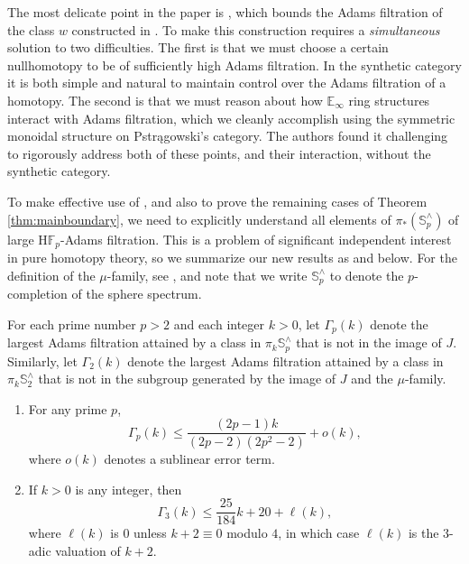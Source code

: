 \begin{rmk}
The most delicate point in the paper is , which bounds the Adams filtration of the class $w$ constructed in . To make this construction requires a \emph{simultaneous} solution to two difficulties. The first is that we must choose a certain nullhomotopy to be of sufficiently high Adams filtration. In the synthetic category it is both simple and natural to maintain control over the Adams filtration of a homotopy. The second is that we must reason about how $\mathbb{E}_\infty$ ring structures interact with Adams filtration, which we cleanly accomplish using the symmetric monoidal structure on Pstr\k{a}gowski's category. The authors found it challenging to rigorously address both of these points, and their interaction, without the synthetic category. 

\end{rmk}

To make effective use of , and also to prove the remaining cases of Theorem \ref{thm:mainboundary}, we need to explicitly understand all elements of $\pi_*(\mathbb{S}^{\wedge}_{p})$ of large $\mathrm{H}\mathbb{F}_p$-Adams filtration.  This is a problem of significant independent interest in pure homotopy theory, so we summarize our new results as  and  below. For the definition of the $\mu$-family, see \cite{AdamsJIV}, and note that we write $\mathbb{S}_p^{\wedge}$ to denote the $p$-completion of the sphere spectrum.

\begin{thm} \label{thm:Burklund}
  For each prime number $p>2$ and each integer $k>0$, let $\Gamma_p(k)$ denote the largest Adams filtration attained by a class in $\pi_{k} \mathbb{S}^{\wedge}_p$ that is not in the image of $J$.
  Similarly, let $\Gamma_2(k)$ denote the largest Adams filtration attained by a class in $\pi_k \mathbb{S}^{\wedge}_2$ that is not in the subgroup generated by the image of $J$ and the $\mu$-family.
  \begin{enumerate}
  \item For any prime $p$, 
    $$ \Gamma_p(k) \leq \frac{(2p-1)k}{(2p-2)(2p^2-2)} + o(k),$$
    where $o(k)$ denotes a sublinear error term. 
  \item If $k>0$ is any integer, then
    $$ \Gamma_3(k) \leq \frac{25}{184}k + 20 + \ell(k),$$
    where $\ell(k)$ is $0$ unless $k+2 \equiv 0$ modulo $4$, in which case $\ell(k)$ is the $3$-adic valuation of $k+2$.
  \end{enumerate}
\end{thm}

